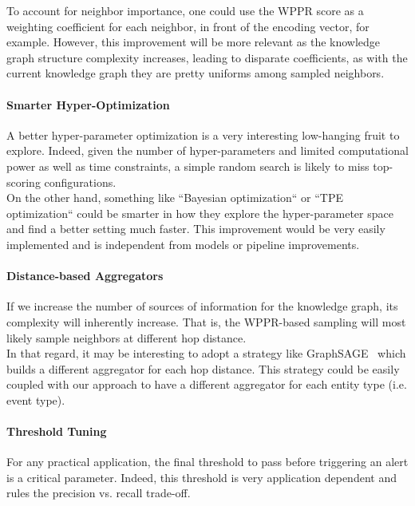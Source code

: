 To account for neighbor importance, one could use the WPPR score as a weighting coefficient for each neighbor, in front of the encoding vector, for example. However, this improvement will be more relevant as the knowledge graph structure complexity increases, leading to disparate coefficients, as with the current knowledge graph they are pretty uniforms among sampled neighbors.

\paragraph{Smarter Hyper-Optimization}
A better hyper-parameter optimization is a very interesting low-hanging fruit to explore. Indeed, given the number of hyper-parameters and limited computational power as well as time constraints, a simple random search is likely to miss top-scoring configurations. \\

On the other hand, something like ``Bayesian optimization`` or ``TPE optimization`` could be smarter in how they explore the hyper-parameter space and find a better setting much faster. This improvement would be very easily implemented and is independent from models or pipeline improvements.

\paragraph{Distance-based Aggregators}
If we increase the number of sources of information for the knowledge graph, its complexity will inherently increase. That is, the WPPR-based sampling will most likely sample neighbors at different hop distance. \\

In that regard, it may be interesting to adopt a strategy like GraphSAGE~\cite{DBLP:journals/corr/HamiltonYL17} which builds a different aggregator for each hop distance. This strategy could be easily coupled with our approach to have a different aggregator for each entity type (i.e. event type).

\paragraph{Threshold Tuning}
For any practical application, the final threshold to pass before triggering an alert is a critical parameter. Indeed, this threshold is very application dependent and rules the precision vs. recall trade-off. \\

